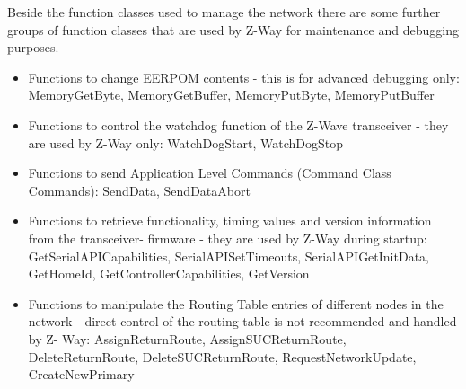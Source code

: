 Beside the function classes used to manage the network there are some further groups of function classes that are used by Z-Way for maintenance and debugging purposes.
\begin{itemize}
\item Functions to change EERPOM contents - this is for advanced debugging only: MemoryGetByte, MemoryGetBuffer, MemoryPutByte, MemoryPutBuffer
\item Functions to control the watchdog function of the Z-Wave transceiver - they are used by Z-Way only: WatchDogStart, WatchDogStop
\item Functions to send Application Level Commands (Command Class Commands): SendData, SendDataAbort
\item Functions to retrieve functionality, timing values  and version information from the transceiver- firmware -  they are used by Z-Way during startup: GetSerialAPICapabilities, SerialAPISetTimeouts, SerialAPIGetInitData, GetHomeId, GetControllerCapabilities, GetVersion
\item Functions to manipulate the Routing Table entries of different nodes in the network - direct control of the routing table is not recommended and handled by Z- Way: AssignReturnRoute, 
AssignSUCReturnRoute, DeleteReturnRoute, DeleteSUCReturnRoute, RequestNetworkUpdate, CreateNewPrimary

\end{itemize}
